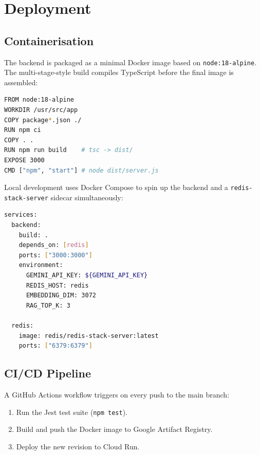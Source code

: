 \documentclass[11pt,a4paper]{article}
\begin{document}
\section{Deployment}

\subsection{Containerisation}

The backend is packaged as a minimal Docker image based on \texttt{node:18-alpine}.
The multi-stage-style build compiles TypeScript before the final image is assembled:

\begin{lstlisting}[language=bash, basicstyle=\ttfamily\footnotesize,
  backgroundcolor=\color{codeBack}, frame=single, framerule=0.5pt,
  rulecolor=\color{algoGray!40}, captionpos=b,
  caption={Dockerfile (condensed)}]
FROM node:18-alpine
WORKDIR /usr/src/app
COPY package*.json ./
RUN npm ci
COPY . .
RUN npm run build    # tsc -> dist/
EXPOSE 3000
CMD ["npm", "start"] # node dist/server.js
\end{lstlisting}

Local development uses Docker Compose to spin up the backend and a
\texttt{redis-stack-server} sidecar simultaneously:

\begin{lstlisting}[language=bash, basicstyle=\ttfamily\footnotesize,
  backgroundcolor=\color{codeBack}, frame=single, framerule=0.5pt,
  rulecolor=\color{algoGray!40}, captionpos=b,
  caption={docker-compose.yml (abridged)}]
services:
  backend:
    build: .
    depends_on: [redis]
    ports: ["3000:3000"]
    environment:
      GEMINI_API_KEY: ${GEMINI_API_KEY}
      REDIS_HOST: redis
      EMBEDDING_DIM: 3072
      RAG_TOP_K: 3

  redis:
    image: redis/redis-stack-server:latest
    ports: ["6379:6379"]
\end{lstlisting}

\subsection{CI/CD Pipeline}

A GitHub Actions workflow triggers on every push to the main branch:

\begin{enumerate}[noitemsep]
  \item Run the Jest test suite (\texttt{npm test}).
  \item Build and push the Docker image to Google Artifact Registry.
  \item Deploy the new revision to Cloud Run.
\end{enumerate}
\end{document}
